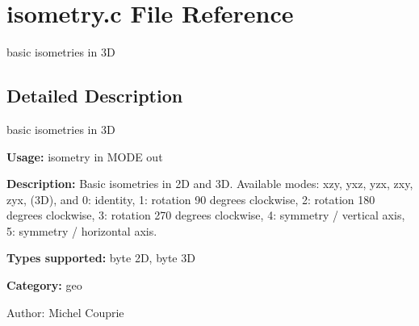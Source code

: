 \section{isometry.c File Reference}
\label{isometry_8c}
basic isometries in 3D  




\label{_details}
\subsection{Detailed Description}
basic isometries in 3D 

{\bf Usage:} isometry in MODE out

{\bf Description:} Basic isometries in 2D and 3D. Available modes: xzy, yxz, yzx, zxy, zyx, (3D), and 0: identity, 1: rotation 90 degrees clockwise, 2: rotation 180 degrees clockwise, 3: rotation 270 degrees clockwise, 4: symmetry / vertical axis, 5: symmetry / horizontal axis.

{\bf Types supported:} byte 2D, byte 3D

{\bf Category:} geo

\begin{Desc}
\item[Author:]Michel Couprie \end{Desc}
